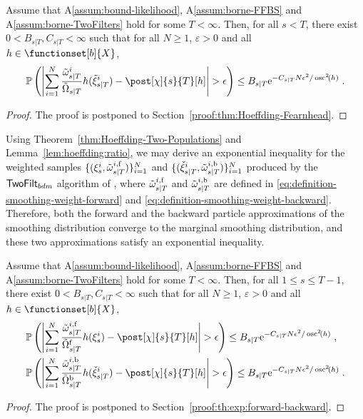 \begin{thm}
\label{thm:Hoeffding-Fearnhead}
Assume that A\ref{assum:bound-likelihood}, A\ref{assum:borne-FFBS} and A\ref{assum:borne-TwoFilters} hold for some $T<\infty$. Then, for all $s<T$, there exist $0 < B_{s|T},C_{s|T} < \infty$ such that for all $N\ge 1$, $\varepsilon>0$ and all  $h \in \functionset[b]{X}$,
\begin{equation*}
\PP\left( \left| \sum_{i=1}^N \frac{\smwght{s}{T}{i}}{\tilde{\Omega}_{s|T}} h(\smpart{s}{T}{i}) - \post[\chi]{s}{T} [h] \right| > \epsilon \right) \leq  B_{s|T} \rme^{-C_{s|T} N \epsilon^2 / \oscnorm[2]{h}} \eqsp.
\end{equation*}
\end{thm}
\begin{proof}
The proof is postponed to Section~\ref{proof:thm:Hoeffding-Fearnhead}.
\end{proof}

Using Theorem~\ref{thm:Hoeffding-Two-Populations} and Lemma~\ref{lem:hoeffding:ratio}, we may derive an exponential inequality for the weighted samples $\{ (\xi_{s}^{i},\tilde{\omega}_{s|T}^{i, \mathrm{f}}) \}_{i=1}^N$ and $ \{ ({\check{\xi}}_{s|T}^{i},\tilde{\omega}_{s|T}^{i, \mathrm{b}}) \}_{i=1}^N$ produced by the $\mathsf{TwoFilt}_{bdm}$ algorithm of  \cite{briers:doucet:maskell:2010}, where $\tilde{\omega}_{s|T}^{i, \mathrm{f}}$  and $\tilde{\omega}_{s|T}^{i, \mathrm{b}}$ are defined in \eqref{eq:definition-smoothing-weight-forward} and \eqref{eq:definition-smoothing-weight-backward}. Therefore, both the forward and the backward particle approximations of the smoothing distribution converge to the marginal smoothing distribution, and these two approximations satisfy an exponential inequality.
\begin{thm}
\label{th:exp:forward-backward}
Assume that A\ref{assum:bound-likelihood}, A\ref{assum:borne-FFBS} and A\ref{assum:borne-TwoFilters} hold for some $T<\infty$. Then, for all $1\le s\le T-1$, there exist $0 < B_{s|T},C_{s|T} <\infty$ such that for all $N\ge 1$, $\varepsilon >0$ and all $h \in \functionset[b]{X}$,
\begin{align}
\label{eq:Exponential-Inequality-Forward}
&\PP\left( \left| \sum_{i=1}^N \frac{\smwght{s}{T}{i, \mathrm{f}}}{\tilde{\Omega}^{\mathrm{f}}_{s|T}} h(\epart{s}{i}) - \post[\Xinit]{s}{T} [h] \right| > \epsilon \right) \leq  B_{s|T} \rme^{-C_{s|T} N \epsilon^2 / \oscnorm[2]{h}} \eqsp, \\
\label{eq:Exponential-Inequality-Backward}
&\PP\left( \left| \sum_{i=1}^N \frac{\smwght{s}{T}{i, \mathrm{b}}}{\tilde{\Omega}^{\mathrm{b}}_{s|T}} h(\ebackpart{s}{T}{i}) - \post[\Xinit]{s}{T} [h] \right| > \epsilon \right) \leq  B_{s|T} \rme^{-C_{s|T} N \epsilon^2 / \oscnorm[2]{h}} \eqsp.
\end{align}
\end{thm}
\begin{proof}
The proof is postponed to Section~\ref{proof:th:exp:forward-backward}.
\end{proof}

